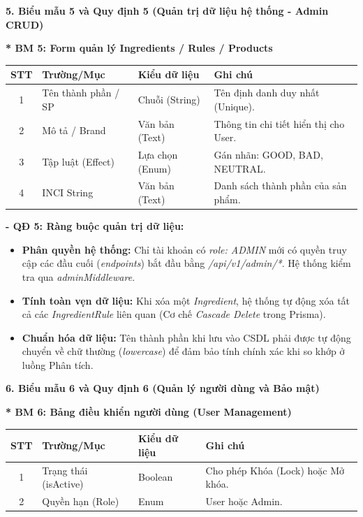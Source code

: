 \documentclass[12pt,a4paper]{article}
\begin{document}
\vspace{0.5cm}
\textbf{5. Biểu mẫu 5 và Quy định 5 (Quản trị dữ liệu hệ thống - Admin CRUD)}

\textbf{* BM 5: Form quản lý Ingredients / Rules / Products}
\begin{center}
\begin{tabular}{|c|p{3.5cm}|p{3.5cm}|p{5cm}|}
\hline
\textbf{STT} & \textbf{Trường/Mục} & \textbf{Kiểu dữ liệu} & \textbf{Ghi chú} \\
\hline
1 & Tên thành phần / SP & Chuỗi (String) & Tên định danh duy nhất (Unique). \\
\hline
2 & Mô tả / Brand & Văn bản (Text) & Thông tin chi tiết hiển thị cho User. \\
\hline
3 & Tập luật (Effect) & Lựa chọn (Enum) & Gán nhãn: GOOD, BAD, NEUTRAL. \\
\hline
4 & INCI String & Văn bản (Text) & Danh sách thành phần của sản phẩm. \\
\hline
\end{tabular}
\end{center}

\textbf{- QĐ 5: Ràng buộc quản trị dữ liệu:}
\begin{itemize}
    \item \textbf{Phân quyền hệ thống:} Chỉ tài khoản có \textit{role: ADMIN} mới có quyền truy cập các đầu cuối (\textit{endpoints}) bắt đầu bằng \textit{/api/v1/admin/*}. Hệ thống kiểm tra qua \textit{adminMiddleware}.
    \item \textbf{Tính toàn vẹn dữ liệu:} Khi xóa một \textit{Ingredient}, hệ thống tự động xóa tất cả các \textit{IngredientRule} liên quan (Cơ chế \textit{Cascade Delete} trong Prisma).
    \item \textbf{Chuẩn hóa dữ liệu:} Tên thành phần khi lưu vào CSDL phải được tự động chuyển về chữ thường (\textit{lowercase}) để đảm bảo tính chính xác khi so khớp ở luồng Phân tích.
\end{itemize}

\vspace{0.5cm}
\textbf{6. Biểu mẫu 6 và Quy định 6 (Quản lý người dùng và Bảo mật)}

\textbf{* BM 6: Bảng điều khiển người dùng (User Management)}
\begin{center}
\begin{tabular}{|c|p{3.5cm}|p{3.5cm}|p{5cm}|}
\hline
\textbf{STT} & \textbf{Trường/Mục} & \textbf{Kiểu dữ liệu} & \textbf{Ghi chú} \\
\hline
1 & Trạng thái (isActive) & Boolean & Cho phép Khóa (Lock) hoặc Mở khóa. \\
\hline
2 & Quyền hạn (Role) & Enum & User hoặc Admin. \\
\hline
\end{tabular}
\end{center}
\end{document}
